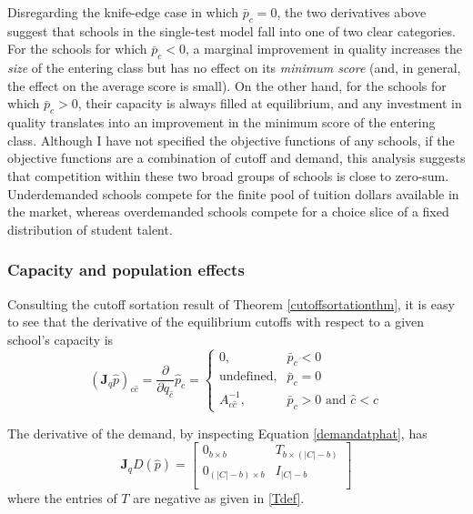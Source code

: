 \documentclass[12pt]{article}
\theoremstyle{definition}
\begin{document}
Disregarding the knife-edge case in which $\bar p_c = 0$, the two derivatives above suggest that schools in the single-test model fall into one of two clear categories. For the schools for which $\bar p_c < 0$, a marginal improvement in quality increases the \emph{size} of the entering class but has no effect on its \emph{minimum score} (and, in general, the effect on the average score is small). On the other hand, for the schools for which $\bar p_c > 0$, their capacity is always filled at equilibrium, and any investment in quality translates into an improvement in the minimum score of the entering class. Although I have not specified the objective functions of any schools, if the objective functions are a combination of cutoff and demand, this analysis suggests that competition within these two broad groups of schools is close to zero-sum. Underdemanded schools compete for the finite pool of tuition dollars available in the market, whereas overdemanded schools compete for a choice slice of a fixed distribution of student talent.

\subsubsection{Capacity and population effects}
Consulting the cutoff sortation result of Theorem \ref{cutoffsortationthm}, it is easy to see that the derivative of the equilibrium cutoffs with respect to a given school's capacity is
\begin{equation}\label{jac-q-p}
\left(\mathbf{J}_q \hat p\right)_{c\hat c} =
\frac{\partial}{\partial q_{\hat c}} \hat p_c = \begin{cases}
0, & \bar p_c < 0 \\
\text{undefined}, & \bar p_c = 0 \\
A^{-1}_{c \hat c}, & \bar p_c > 0 \text{ and }\hat c < c 
\end{cases}
\end{equation}

The derivative of the demand, by inspecting Equation \eqref{demandatphat}, has
\begin{equation}\mathbf{J}_q D(\hat p) =
\begin{bmatrix}
0_{b \times b} & T_{b \times (|C| - b)} \\
0_{(|C| - b) \times b} & I_{|C| - b} \\
\end{bmatrix} 
\end{equation}
where the entries of $T$ are negative as given in \eqref{Tdef}.
\end{document}
